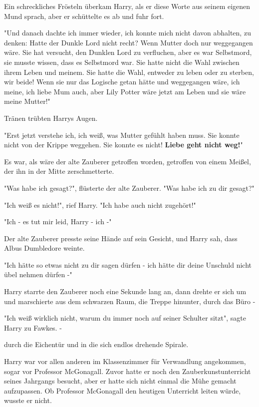 {Ein schreckliches Frösteln überkam Harry, als er diese Worte aus seinem eigenen Mund sprach, aber er schüttelte es ab und fuhr fort.

"Und danach dachte ich immer wieder, ich konnte mich nicht davon abhalten, zu denken: Hatte der Dunkle Lord nicht recht? Wenn Mutter doch nur weggegangen wäre. Sie hat versucht, den Dunklen Lord zu verfluchen, aber es war Selbstmord, sie musste wissen, dass es Selbstmord war. Sie hatte nicht die Wahl zwischen ihrem Leben und meinem. Sie hatte die Wahl, entweder zu leben oder zu sterben, wir beide! Wenn sie nur das Logische getan hätte und weggegangen wäre, ich meine, ich liebe Mum auch, aber Lily Potter wäre jetzt am Leben und sie wäre meine Mutter!"

Tränen trübten Harrys Augen.

"Erst jetzt verstehe ich, ich weiß, was Mutter gefühlt haben muss. Sie konnte nicht von der Krippe weggehen. Sie konnte es nicht! \textbf{Liebe geht nicht weg!}"

Es war, als wäre der alte Zauberer getroffen worden, getroffen von einem Meißel, der ihn in der Mitte zerschmetterte.

"Was habe ich gesagt?", flüsterte der alte Zauberer. "Was habe ich zu dir gesagt?"

"Ich weiß es nicht!", rief Harry. "Ich habe auch nicht zugehört!"

"Ich - es tut mir leid, Harry - ich -"

Der alte Zauberer presste seine Hände auf sein Gesicht, und Harry sah, dass Albus Dumbledore weinte.

"Ich hätte so etwas nicht zu dir sagen dürfen - ich hätte dir deine Unschuld nicht übel nehmen dürfen -"

Harry starrte den Zauberer noch eine Sekunde lang an, dann drehte er sich um und marschierte aus dem schwarzen Raum, die Treppe hinunter, durch das Büro -

"Ich weiß wirklich nicht, warum du immer noch auf seiner Schulter sitzt", sagte Harry zu Fawkes. -

durch die Eichentür und in die sich endlos drehende Spirale.

Harry war vor allen anderen im Klassenzimmer für Verwandlung angekommen, sogar vor Professor McGonagall. Zuvor hatte er noch den Zauberkunstunterricht seines Jahrgangs besucht, aber er hatte sich nicht einmal die Mühe gemacht aufzupassen. Ob Professor McGonagall den heutigen Unterricht leiten würde, wusste er nicht.

}
